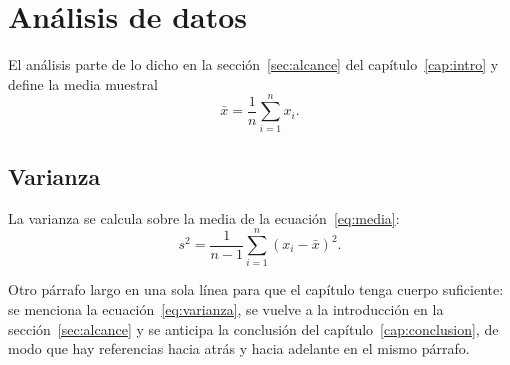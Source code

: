 \chapter{Análisis de datos}\label{cap:analisis}

El análisis parte de lo dicho en la sección~\ref{sec:alcance} del capítulo~\ref{cap:intro} y define la media muestral
\begin{equation}\label{eq:media}
  \bar{x} = \frac{1}{n}\sum_{i=1}^{n} x_i .
\end{equation}

\section{Varianza}\label{sec:varianza}

La varianza se calcula sobre la media de la ecuación~\eqref{eq:media}:
\begin{equation}\label{eq:varianza}
  s^2 = \frac{1}{n-1}\sum_{i=1}^{n} \left(x_i - \bar{x}\right)^2 .
\end{equation}

Otro párrafo largo en una sola línea para que el capítulo tenga cuerpo suficiente: se menciona la ecuación~\eqref{eq:varianza}, se vuelve a la introducción en la sección~\ref{sec:alcance} y se anticipa la conclusión del capítulo~\ref{cap:conclusion}, de modo que hay referencias hacia atrás y hacia adelante en el mismo párrafo.
